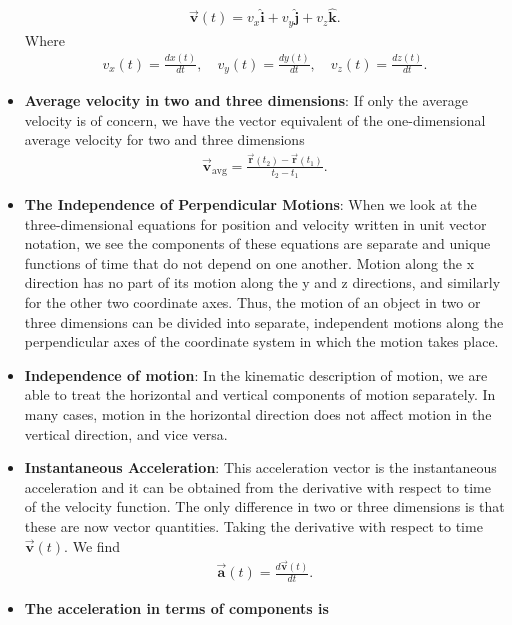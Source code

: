 \documentclass{report}
\begin{document}
\begin{itemize}
\begin{align*}
                \vec{\mathbf{v}}(t) = v_{x}\hat{\mathbf{i}} + v_{y}\hat{\mathbf{j}} + v_{z}\hat{\mathbf{k}}
            .\end{align*}
            Where 
            \begin{align*}
                v_{x}(t) = \frac{dx(t)}{dt}, \quad v_{y}(t) = \frac{dy(t)}{dt}, \quad v_{z}(t) = \frac{dz(t)}{dt}
            .\end{align*}
        \item \textbf{Average velocity in two and three dimensions}: 
            If only the average velocity is of concern, we have the vector equivalent of the one-dimensional average velocity for two and three dimensions
            \begin{align*}
                \vec{\mathbf{v}}_{\text{avg}} = \frac{\vec{\mathbf{r}}(t_{2})-\vec{\mathbf{r}}(t_{1})}{t_{2} - t_{1}}
            .\end{align*}
        \item \textbf{The Independence of Perpendicular Motions}: When we look at the three-dimensional equations for position and velocity written in unit vector notation, we see the components of these equations are separate and unique functions of time that do not depend on one another. Motion along the x direction has no part of its motion along the y and z directions, and similarly for the other two coordinate axes. Thus, the motion of an object in two or three dimensions can be divided into separate, independent motions along the perpendicular axes of the coordinate system in which the motion takes place.
        \item \textbf{Independence of motion}: In the kinematic description of motion, we are able to treat the horizontal and vertical components of motion separately. In many cases, motion in the horizontal direction does not affect motion in the vertical direction, and vice versa.
        \item \textbf{Instantaneous Acceleration}: This acceleration vector is the instantaneous acceleration and it can be obtained from the derivative with respect to time of the velocity function. The only difference in two or three dimensions is that these are now vector quantities. Taking the derivative with respect to time $\vec{\mathbf{v}}(t) $. We find
            \begin{align*}
               \vec{\mathbf{a}}(t) = \frac{d\vec{\mathbf{v}}(t)}{dt} 
            .\end{align*}
        \item \textbf{The acceleration in terms of components is}

\end{itemize}
\end{document}
